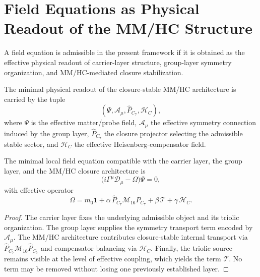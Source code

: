 \section{Field Equations as Physical Readout of the MM/HC Structure}
\label{sec:field-readout}

\begin{definition}
\label{def:field-readout-principle}
A field equation is admissible in the present framework if it is obtained as
the effective physical readout of carrier-layer structure, group-layer symmetry
organization, and MM/HC-mediated closure stabilization.
\end{definition}

\begin{definition}
The minimal physical readout of the closure-stable MM/HC architecture is
carried by the tuple
\[
(\Psi,\mathcal A_\mu,\hat P_{C_7},\mathcal H_C),
\]
where $\Psi$ is the effective matter/probe field, $\mathcal A_\mu$ the
effective symmetry connection induced by the group layer,
$\hat P_{C_7}$ the closure projector selecting the admissible stable sector,
and $\mathcal H_C$ the effective Heisenberg-compensator field.
\end{definition}

\begin{theorem}
\label{thm:minimal-mmhc-field-equation}
The minimal local field equation compatible with the carrier layer, the group
layer, and the MM/HC closure architecture is
\[
\bigl(i\Gamma^\mu\mathcal D_\mu-\Omega\bigr)\Psi=0,
\]
with effective operator
\[
\Omega
=
m_0\mathbf 1
+\alpha\,\hat P_{C_7}\mathcal M_{16}\hat P_{C_7}
+\beta\,\mathcal T
+\gamma\,\mathcal H_C.
\]
\end{theorem}

\begin{proof}
The carrier layer fixes the underlying admissible object and its triolic
organization. The group layer supplies the symmetry transport term encoded by
$\mathcal A_\mu$. The MM/HC architecture contributes closure-stable internal
transport via $\hat P_{C_7}\mathcal M_{16}\hat P_{C_7}$ and compensator
balancing via $\mathcal H_C$. Finally, the triolic source remains visible at
the level of effective coupling, which yields the term $\mathcal T$. No term
may be removed without losing one previously established layer.
\end{proof}

